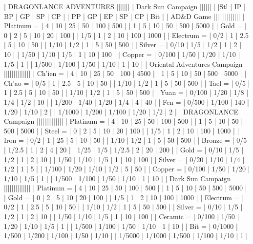 | DRAGONLANCE ADVENTURES ||||||| | Dark Sun Campaign ||||||
| |Stl | IP | BP | GP | SP | CP | | PP | GP | EP | SP | CP | Bit |
| AD&D Game ||||||||||||||
| Platinum = | 4 | 10 | 25 | 50 | 100 | 500 | | 1 | 5 | 10 | 50 | 500 | 5000 |
| Gold = | 0 | 2 | 5 | 10 | 20 | 100 | | 1/5 | 1 | 2 | 10 | 100 | 1000 |
| Electrum = | 0/2 | 1 | 2.5 | 5 | 10 | 50 | | 1/10 | 1/2 | 1 | 5 | 50 | 500 |
| Silver = | 0/10 | 1/5 | 1/2 | 1 | 2 | 10 | | 1/50 | 1/10 | 1/5 | 1 | 10 | 100 |
| Copper = | 0/100 | 1/50 | 1/20 | 1/10 | 1/5 | 1 | | 1/500 | 1/100 | 1/50 | 1/10 | 1 | 10 |
| Oriental Adventures Campaign ||||||||||||||
| Ch’ien = | 4 | 10 | 25 | 50 | 100 | 4500 | | 1 | 5 | 10 | 50 | 500 | 5000 |
| Ch’ao = | 0/5 | 1 | 2.5 | 5 | 10 | 50 | | 1/10 | 1/2 | 1 | 5 | 50 | 500 |
| Tael = | 0/5 | 1 | 2.5 | 5 | 10 | 50 | | 1/10 | 1/2 | 1 | 5 | 50 | 500 |
| Yuan = | 0/100 | 1/20 | 1/8 | 1/4 | 1/2 | 10 | | 1/200 | 1/40 | 1/20 | 1/4 | 4 | 40 |
| Fen = | 0/500 | 1/100 | 140 | 1/20 | 1/10 | 2 | | 1/1000 | 1/200 | 1/100 | 1/20 | 1/2 | 2 |
| DRAGONLANCE Campaign ||||||||||||||
| Platinum = | 4 | 10 | 25 | 50 | 100 | 500 | | 1 | 5 | 10 | 50 | 500 | 5000 |
| Steel = | 0 | 2 | 5 | 10 | 20 | 100 | | 1/5 | 1 | 2 | 10 | 100 | 1000 |
| Iron = | 0/2 | 1 | 25 | 5 | 10 | 50 | | 1/10 | 1/2 | 1 | 5 | 50 | 500 |
| Bronze = | 0/5 | 1/2.5 | 1 | 2 | 4 | 20 | | 1/25 | 1/5 | 1/2.5 | 2 | 20 | 200 |
| Gold = | 0/10 | 1/5 | 1/2 | 1 | 2 | 10 | | 1/50 | 1/10 | 1/5 | 1 | 10 | 100 |
| Silver = | 0/20 | 1/10 | 1/4 | 1/2 | 1 | 5 | | 1/100 | 1/20 | 1/10 | 1/2 | 5 | 50 |
| Copper = | 0/100 | 1/50 | 1/20 | 1/10 | 1/5 | 1 | | 1/500 | 1/100 | 1/50 | 1/10 | 1 | 10 |
| Dark Sun Campaign ||||||||||||||
| Platinum = | 4 | 10 | 25 | 50 | 100 | 500 | | 1 | 5 | 10 | 50 | 500 | 5000 |
| Gold = | 0 | 2 | 5 | 10 | 20 | 100 | | 1/5 | 1 | 2 | 10 | 100 | 1000 |
| Electrum = | 0/2 | 1 | 2.5 | 5 | 10 | 50 | | 1/10 | 1/2 | 1 | 5 | 50 | 500 |
| Silver = | 0/10 | 1/5 | 1/2 | 1 | 2 | 10 | | 1/50 | 1/10 | 1/5 | 1 | 10 | 100 |
| Ceramic = | 0/100 | 1/50 | 1/20 | 1/10  | 1/5 | 1 | | 1/500 | 1/100 | 1/50 | 1/10 | 1 | 10 |
| Bit = | 0/1000 | 1/500 | 1/200 | 1/100 | 1/50 | 1/10 | | 1/5000 | 1/1000 | 1/500 | 1/100 | 1/10 | 1 |